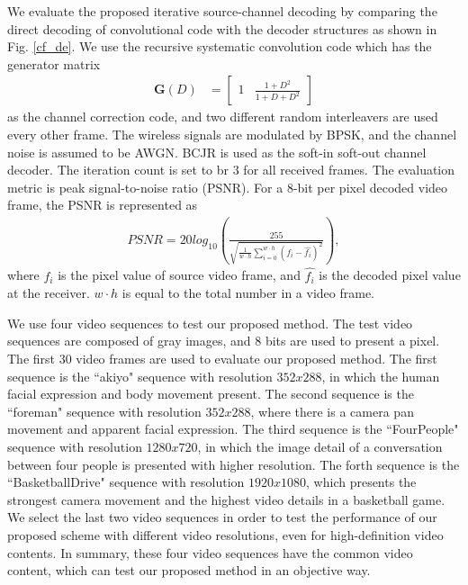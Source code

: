 \documentclass[10pt,twocolumn,twoside]{IEEEtran}
\begin{document}
We evaluate the proposed iterative source-channel decoding by comparing the direct decoding of convolutional code with the decoder structures as shown in Fig. \ref{cf_de}. We use the recursive systematic convolution code which has the generator matrix 
\begin{align}
\mathbf{G}(D) &= \left[
\begin{array}{cc}
1 & \frac{1+D^2}{1+D+D^2}
\end{array} \right]
\label{cf_gnm} 
\end{align}
as the channel correction code, and two different random interleavers are used every other frame. The wireless signals are modulated by BPSK, and the channel noise is assumed to be AWGN. BCJR \cite{BCJR} is used as the soft-in soft-out channel decoder. The iteration count is set to br $3$ for all received frames. The evaluation metric is peak signal-to-noise ratio (PSNR). For a $8$-bit per pixel decoded video frame, the PSNR is represented as 
\begin{align}
PSNR = 20log_{10}({\frac{255}{\sqrt{\frac{1}{w\cdot h}\sum_{i=0}^{w\cdot h}{({f_i}-\hat{f_i})^2}}}}),
\end{align}
where $f_i$ is the pixel value of source video frame, and $\hat{f_i}$ is the decoded pixel value at the receiver. $w\cdot h$ is equal to the total number in a video frame.

We use four video sequences to test our proposed method. The test video sequences are composed of gray images, and $8$ bits are used to present a pixel. The first $30$ video frames are used to evaluate our proposed method. The first sequence is the ``akiyo" sequence with resolution $352x288$, in which the human facial expression and body movement present. The second sequence is the ``foreman" sequence with resolution $352x288$, where there is a camera pan movement and apparent facial expression. The third sequence is the ``FourPeople" sequence with resolution $1280x720$, in which the image detail of a conversation between four people is presented with higher resolution. The forth sequence is the ``BasketballDrive" sequence with resolution $1920x1080$, which presents the strongest camera movement and the highest video details in a basketball game. We select the last two video sequences in order to test the performance of our proposed scheme with different video resolutions, even for high-definition video contents. In summary, these four video sequences have the common video content, which can test our proposed method in an objective way.
\end{document}
